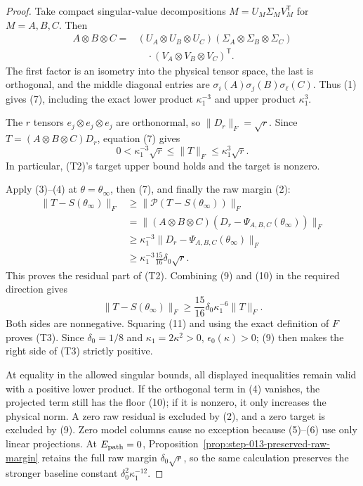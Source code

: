 \begin{proof}
Take compact singular-value decompositions
\(M=U_M\Sigma_MV_M^{\mathsf T}\) for \(M=A,B,C\). Then
\[
\begin{aligned}
  A\otimes B\otimes C
  ={}&(U_A\otimes U_B\otimes U_C)
      (\Sigma_A\otimes\Sigma_B\otimes\Sigma_C)\\
     &\quad\cdot(V_A\otimes V_B\otimes V_C)^{\mathsf T}.
\end{aligned}\tag{8}
\]
The first factor is an isometry into the physical tensor space, the last is
orthogonal, and the middle diagonal entries are
\(\sigma_i(A)\sigma_j(B)\sigma_\ell(C)\). Thus (1) gives (7), including the
exact lower product \(\kappa_1^{-3}\) and upper product \(\kappa_1^3\).

The \(r\) tensors \(e_j\otimes e_j\otimes e_j\) are orthonormal, so
\(\|D_r\|_F=\sqrt r\). Since
\(T=(A\otimes B\otimes C)D_r\), equation (7) gives
\[
  0<\kappa_1^{-3}\sqrt r
  \le\|T\|_F\le\kappa_1^3\sqrt r.                         \tag{9}
\]
In particular, (T2)'s target upper bound holds and the target is nonzero.

Apply (3)--(4) at \(\theta=\theta_\infty\), then (7), and finally the
raw margin (2):
\[
\begin{aligned}
  \|T-S(\theta_\infty)\|_F
  &\ge\|\mathcal P(T-S(\theta_\infty))\|_F\\
  &=\|(A\otimes B\otimes C)
      (D_r-\Psi_{A,B,C}(\theta_\infty))\|_F\\
  &\ge\kappa_1^{-3}
      \|D_r-\Psi_{A,B,C}(\theta_\infty)\|_F\\
  &\ge\kappa_1^{-3}\frac{15}{16}\delta_0\sqrt r.
\end{aligned}\tag{10}
\]
This proves the residual part of (T2). Combining (9) and (10) in the required
direction gives
\[
  \|T-S(\theta_\infty)\|_F
  \ge\frac{15}{16}\delta_0\kappa_1^{-6}\|T\|_F.          \tag{11}
\]
Both sides are nonnegative. Squaring (11) and using the exact definition of
\(F\) proves (T3). Since \(\delta_0=1/8\) and
\(\kappa_1=2\kappa^2>0\), \(\epsilon_0(\kappa)>0\); (9) then makes the
right side of (T3) strictly positive.

At equality in the allowed singular bounds, all displayed inequalities remain
valid with a positive lower product. If the orthogonal term in (4) vanishes,
the projected term still has the floor (10); if it is nonzero, it only
increases the physical norm. A zero raw residual is excluded by (2), and a
zero target is excluded by (9). Zero model columns cause no exception because
(5)--(6) use only linear projections. At \(E_{\rm path}=0\), Proposition~\ref{prop:step-013-preserved-raw-margin} retains the full raw margin \(\delta_0\sqrt r\), so the same
calculation preserves the stronger baseline constant
\(\delta_0^2\kappa_1^{-12}\). 

\end{proof}


